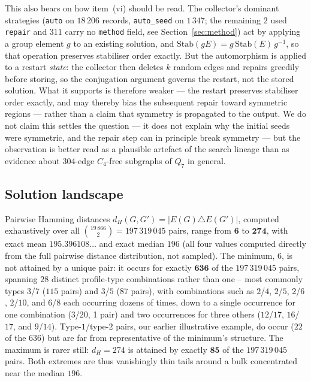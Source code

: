 \documentclass[12pt,a4paper]{article}
\theoremstyle{definition}
\begin{document}
This also bears on how item~(vi) should be read. The collector's dominant
strategies (\texttt{auto} on $18\,206$ records, \texttt{auto\_seed} on
$1\,347$; the remaining $2$ used \texttt{repair} and $311$ carry no
\texttt{method} field, see Section~\ref{sec:method}) act by applying a group
element $g$ to an existing solution, and
$\mathrm{Stab}(gE)=g\,\mathrm{Stab}(E)\,g^{-1}$, so that operation preserves
stabiliser order exactly. But the automorphism is applied to a restart \emph{state}: the collector then
deletes $k$ random edges and repairs greedily before storing, so the
conjugation argument governs the restart, not the stored solution. What it
supports is therefore weaker --- the restart preserves stabiliser order
exactly, and may thereby bias the subsequent repair toward symmetric regions
--- rather than a claim that symmetry is propagated to the output. We do not
claim this settles the question --- it does not explain why the initial seeds
were symmetric, and the repair step can in principle break symmetry --- but the
observation is better read as a plausible artefact of the search lineage than
as evidence about $304$-edge $C_4$-free subgraphs of $Q_7$ in general.

\subsection{Solution landscape}\label{sec:landscape}

Pairwise Hamming distances $d_H(G,G')=|E(G)\triangle E(G')|$, computed
exhaustively over all $\binom{19\,866}{2}=197\,319\,045$ pairs,
range from $\mathbf{6}$ to
$\mathbf{274}$, with exact mean $195.396108\ldots$ and exact median
$196$ (all four values computed directly from the full pairwise
distance distribution, not sampled). The minimum, $6$, is not
attained by a unique pair: it occurs for exactly $\mathbf{636}$ of the
$197\,319\,045$ pairs, spanning $28$ distinct profile-type
combinations rather than one -- most commonly types $3$/$7$ ($115$
pairs) and $3$/$5$ ($87$ pairs), with combinations such as $2$/$4$,
$2$/$5$, $2$/$6$, $2$/$10$, and $6$/$8$ each occurring dozens of
times, down to a single occurrence for one combination
($3$/$20$, 1 pair) and two occurrences for three others
($12$/$17$, $16$/$17$, and $9$/$14$). Type-$1$/type-$2$ pairs, our earlier illustrative
example, do occur ($22$ of the $636$) but are far from
representative of the minimum's structure. The maximum is rarer still:
$d_H=274$ is attained by exactly $\mathbf{85}$ of the
$197\,319\,045$ pairs. Both extremes are thus vanishingly thin tails
around a bulk concentrated near the median $196$.
\end{document}
